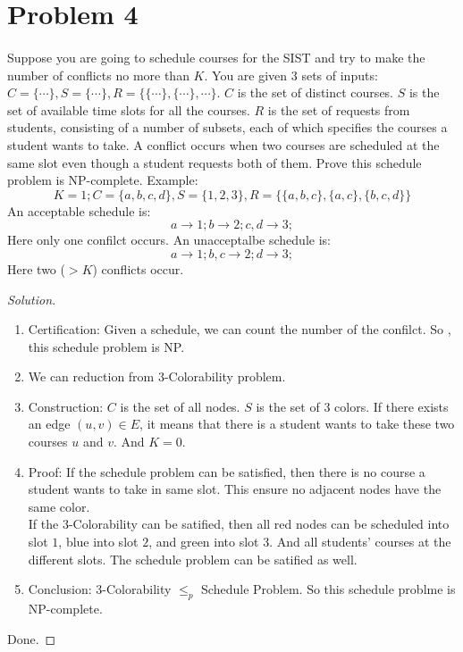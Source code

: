 \documentclass[a4paper]{article}
\newenvironment{solution}
  {\renewcommand\qedsymbol{$\blacksquare$}\begin{proof}[Solution]}
  {\end{proof}}
\begin{document}
\section*{Problem 4}
\paragraph{}
Suppose you are going to schedule courses for the SIST and try to make the number of conflicts no
more than $K$. You are given $3$ sets of inputs: $C = \{\cdots\}, S = \{\cdots\}, R = \{\{\cdots\}, \{\cdots\}, \cdots\}$. $C$ is the set of
distinct courses. $S$ is the set of available time slots for all the courses. $R$ is the set of requests from students,
consisting of a number of subsets, each of which specifies the courses a student wants to take. A conflict
occurs when two courses are scheduled at the same slot even though a student requests both of them. Prove
this schedule problem is NP-complete.
Example:
$$K = 1; C = \{a, b, c, d\}, S = \{1, 2, 3\}, R = \{\{a, b, c\}, \{a, c\}, \{b, c, d\}\}$$
An acceptable schedule is:
$$a \to 1; b \to 2; c, d \to 3;$$
Here only one confilct occurs. An unacceptalbe schedule is:
$$a \to 1; b, c \to 2; d \to 3;$$
Here two ($> K$) conflicts occur.


\begin{solution}\
  \begin{enumerate}[(1)]
    \item Certification: Given a schedule, we can count the number of the confilct. So , this schedule problem is NP.
    \item We can reduction from $3$-Colorability problem.
    \item Construction: $C$ is the set of all nodes. $S$ is the set of 3 colors. If there exists an edge $(u,v)\in E$, it means that there is a student wants to take these two courses $u$ and $v$. And $K=0$.
    \item Proof: If the schedule problem can be satisfied, then there is no course a student wants to take in same slot. This ensure no adjacent nodes have the same color.\\
    If the $3$-Colorability can be satified, then all red nodes can be scheduled into slot $1$, blue into slot $2$, and green into slot $3$. And all students' courses at the different slots. The schedule problem can be satified as well.
    \item Conclusion: $3$-Colorability $\le_{p}$ Schedule Problem. So this schedule problme is NP-complete.
  \end{enumerate}
  Done.
\end{solution}
\end{document}
